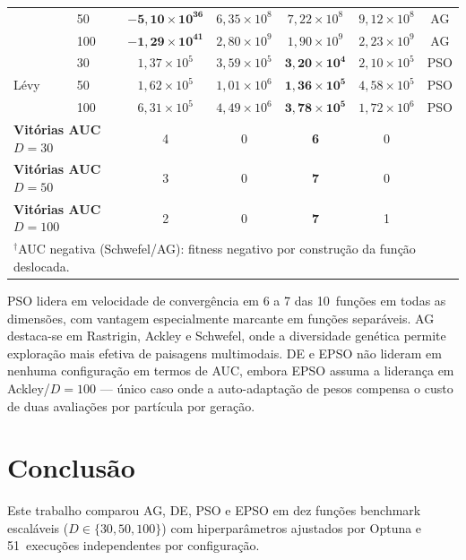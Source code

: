 \documentclass[runningheads]{llncs}
\begin{document}
\begin{table}[H]
\begin{tabular}{llccccc}
  & 50  & \cellcolor{green!20}$\mathbf{-5{,}10{\times}10^{36}}$ & $6{,}35{\times}10^{8}$ & $7{,}22{\times}10^{8}$ & $9{,}12{\times}10^{8}$ & AG \\
  & 100 & \cellcolor{green!20}$\mathbf{-1{,}29{\times}10^{41}}$ & $2{,}80{\times}10^{9}$ & $1{,}90{\times}10^{9}$ & $2{,}23{\times}10^{9}$ & AG \\
\midrule
\multirow{3}{*}{Lévy}
  & 30  & $1{,}37{\times}10^{5}$ & $3{,}59{\times}10^{5}$ & \cellcolor{green!20}$\mathbf{3{,}20{\times}10^{4}}$ & $2{,}10{\times}10^{5}$ & PSO \\
  & 50  & $1{,}62{\times}10^{5}$ & $1{,}01{\times}10^{6}$ & \cellcolor{green!20}$\mathbf{1{,}36{\times}10^{5}}$ & $4{,}58{\times}10^{5}$ & PSO \\
  & 100 & $6{,}31{\times}10^{5}$ & $4{,}49{\times}10^{6}$ & \cellcolor{green!20}$\mathbf{3{,}78{\times}10^{5}}$ & $1{,}72{\times}10^{6}$ & PSO \\
\midrule
\multicolumn{2}{l}{\textbf{Vitórias AUC} $D=30$}  & 4 & 0 & \textbf{6} & 0 & \\
\multicolumn{2}{l}{\textbf{Vitórias AUC} $D=50$}  & 3 & 0 & \textbf{7} & 0 & \\
\multicolumn{2}{l}{\textbf{Vitórias AUC} $D=100$} & 2 & 0 & \textbf{7} & 1 & \\
\bottomrule
\multicolumn{7}{l}{\scriptsize $^\dagger$AUC negativa (Schwefel/AG):
  fitness negativo por construção da função deslocada.}
\end{tabular}
\end{table}

PSO lidera em velocidade de convergência em 6 a 7 das 10~funções em
todas as dimensões, com vantagem especialmente marcante em funções
separáveis. AG destaca-se em Rastrigin, Ackley e Schwefel, onde a
diversidade genética permite exploração mais efetiva de paisagens
multimodais. DE e EPSO não lideram em nenhuma configuração em termos
de AUC, embora EPSO assuma a liderança em Ackley/$D=100$ — único
caso onde a auto-adaptação de pesos compensa o custo de duas
avaliações por partícula por geração.

\section{Conclus\~{a}o}
\label{sec:conclusao}

Este trabalho comparou AG, DE, PSO e EPSO em dez funções benchmark
escaláveis ($D\in\{30,50,100\}$) com hiperparâmetros ajustados por
Optuna e 51~execuções independentes por configuração.
\end{document}
